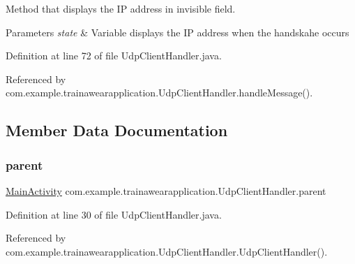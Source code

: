 Method that displays the IP address in invisible field. 


\begin{DoxyParams}{Parameters}
{\em state} & Variable displays the IP address when the handskahe occurs \\
\hline
\end{DoxyParams}


Definition at line 72 of file Udp\+Client\+Handler.\+java.


\begin{DoxyCode}{0}

\end{DoxyCode}


Referenced by com.\+example.\+trainawearapplication.\+Udp\+Client\+Handler.\+handle\+Message().



\subsection{Member Data Documentation}
\mbox{\label{classcom_1_1example_1_1trainawearapplication_1_1_udp_client_handler_a93942bc64a7d7d570d27c9e485d361e4}} 
\subsubsection{\texorpdfstring{parent}{parent}}
{\footnotesize\ttfamily \mbox{\hyperlink{classcom_1_1example_1_1trainawearapplication_1_1_main_activity}{Main\+Activity}} com.\+example.\+trainawearapplication.\+Udp\+Client\+Handler.\+parent\hspace{0.3cm}{\ttfamily [private]}}



Definition at line 30 of file Udp\+Client\+Handler.\+java.



Referenced by com.\+example.\+trainawearapplication.\+Udp\+Client\+Handler.\+Udp\+Client\+Handler().

